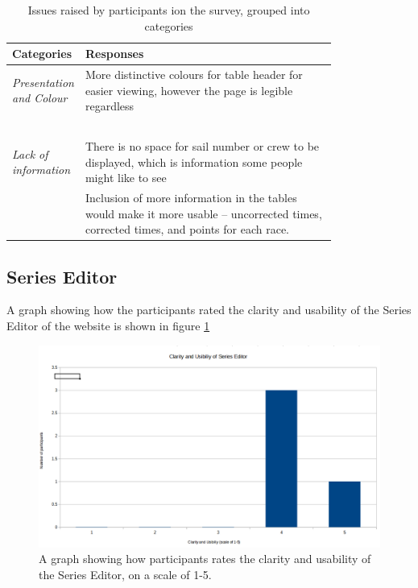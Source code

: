 \documentclass{l4proj}
\begin{document}
\begin{table}[H]
    \centering
    \caption{Issues raised by participants ion the survey, grouped into categories}
    \begin{tabular}{|l|p{0.8\linewidth}|}
    \hline
        \textbf{Categories} & \textbf{Responses}  \\ \hline
        \textit{Presentation and Colour} & More distinctive colours for table header for easier viewing, however the page is legible regardless  \\ \hline
        ~ & ~ \\ \hline
        \textit{Lack of information} & There is no space for sail number or crew to be displayed, which is information some people might like to see  \\ \hline
        ~ & Inclusion of more information in the tables would make it more usable -- uncorrected times, corrected times, and points for each race.  \\ \hline
    \end{tabular}
    \label{tab:table 2}
\end{table}

\subsection{Series Editor}
A graph showing how the participants rated the clarity and usability of the Series Editor of the website is shown in figure \ref{fig:results2}

\begin{figure}[H]
    \centering
    \includegraphics[width=1\linewidth]{images/results 2.png} 

    \caption{A graph showing how participants rates the clarity and usability of the Series Editor, on a scale of 1-5.
    }

    \label{fig:results2}
\end{figure}
\end{document}
